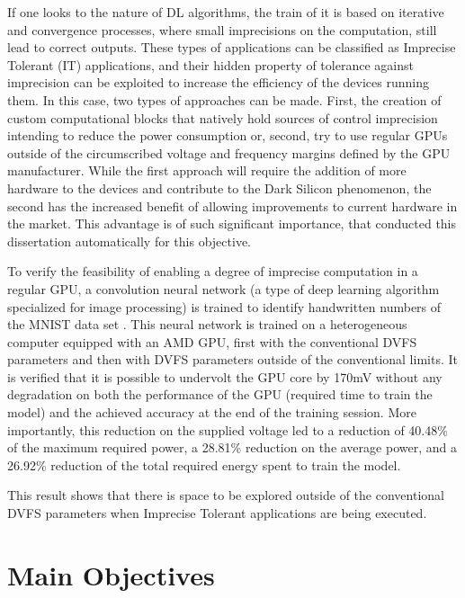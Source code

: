If one looks to the nature of DL algorithms, the train of it is based on iterative and convergence processes, where small imprecisions on the computation, still lead to correct outputs. These types of applications can be classified as Imprecise Tolerant (IT) applications, and their hidden property of tolerance against imprecision can be exploited to increase the efficiency of the devices running them. In this case, two types of approaches can be made. First, the creation of custom computational blocks that natively hold sources of control imprecision intending to reduce the power consumption \cite{mahdiani_efficient_2017} or, second, try to use regular GPUs outside of the circumscribed voltage and frequency margins defined by the GPU manufacturer. While the first approach will require the addition of more hardware to the devices and contribute to the Dark Silicon phenomenon, the second has the increased benefit of allowing improvements to current hardware in the market. This advantage is of such significant importance, that conducted this dissertation automatically for this objective.

To verify the feasibility of enabling a degree of imprecise computation in a regular GPU, a convolution neural network (a type of deep learning algorithm specialized for image processing) is trained to identify handwritten numbers of the MNIST data set \cite{noauthor_mnist_1999}. This neural network is trained on a heterogeneous computer equipped with an AMD GPU, first with the conventional DVFS parameters and then with DVFS parameters outside of the conventional limits. It is verified that it is possible to undervolt the GPU core by 170mV without any degradation on both the performance of the GPU (required time to train the model) and the achieved accuracy at the end of the training session. More importantly, this reduction on the supplied voltage led to a reduction of 40.48\% of the maximum required power, a 28.81\% reduction on the average power, and a 26.92\% reduction of the total required energy spent to train the model.

This result shows that there is space to be explored outside of the conventional DVFS parameters when Imprecise Tolerant applications are being executed.


\section{Main Objectives}
\label{section:objectives}

